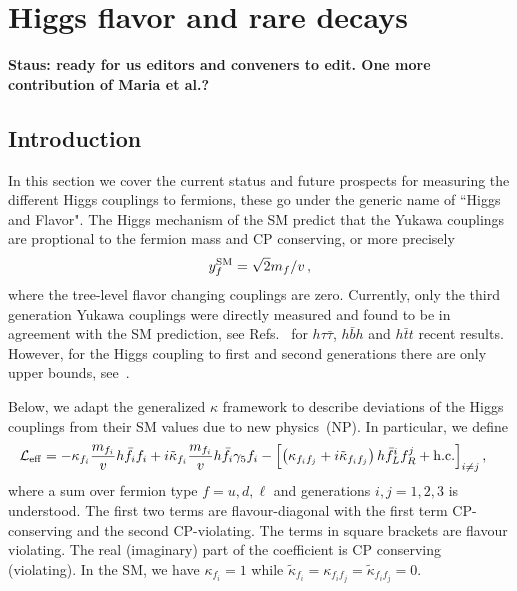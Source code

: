 \documentclass[../report.tex]{subfiles}
\begin{document}
\section{Higgs flavor and rare decays}


{\bf{Staus: ready for us editors and conveners to edit. One more contribution of Maria et al.?}}

\subsection{Introduction}

In this section we cover the current status and future prospects for measuring the different Higgs couplings to fermions, these go under the generic name of ``Higgs and Flavor". 
The Higgs mechanism of the SM predict that the Yukawa couplings are proptional to the fermion mass and CP conserving, or more precisely 
%
\begin{align}
    y^{\rm SM}_f = \sqrt{2} m_f / v \, ,
\end{align}
%
where the tree-level flavor changing couplings are zero. 
Currently, only the third generation Yukawa couplings were directly measured and found to be in agreement with the SM prediction, see Refs.~\cite{} for $h\tau\bar{\tau}$, $h \bar{b} h$ and $h \bar{t} t$ recent results. 
However, for the Higgs coupling to first and second generations there are only upper bounds, see~\cite{}.

Below, we adapt the generalized $\kappa$ framework to describe deviations of the Higgs couplings from their SM values due to new physics~(NP).
In particular, we define 
%
\begin{equation}
\label{eq:L_eff}
\begin{split}
	\mathcal{L}_{\rm eff} &= -\kappa_{f_i} \frac{m_{f_i}}{v} h \bar f_i f_i + i \tilde \kappa_{f_i} \frac{m_{f_i}}{v} h \bar f_i \gamma_5 f_i  
	- \left[\left( \kappa_{f_i f_j} + i \tilde \kappa_{f_i f_j} \right) h \bar f_L^i f_R^j +{\rm h.c.}\right]_{i\neq j}, 
\end{split}
\end{equation}
%
where a sum over fermion type $f=u,d,\ell$ and generations $i,j=1,2,3$ is understood.
The first two terms are flavour-diagonal with the first term CP-conserving and
the second CP-violating.  The terms in square brackets are flavour
violating. The real (imaginary) part of the coefficient is CP
conserving (violating). In the SM, we have $\kappa_{f_i}=1$ while $\tilde
\kappa_{f_i}=\kappa_{{f_i}{f_j}}=\tilde \kappa_{{f_i}{f_j}}=0$.
\end{document}
